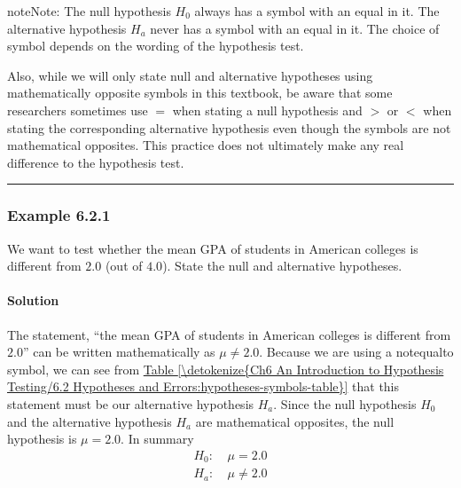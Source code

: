 \documentclass[letterpaper,10pt,english]{jupyterBook}
\begin{document}
\begin{sphinxadmonition}{note}{Note:}
\sphinxAtStartPar
The null hypothesis \(H_0\) always has a symbol with an equal in it. The alternative hypothesis \(H_a\) never has a symbol with an equal in it. The choice of symbol depends on the wording of the hypothesis test.

\sphinxAtStartPar
Also, while we will only state null and alternative hypotheses using mathematically opposite symbols in this textbook, be aware that some researchers sometimes use \(=\) when stating a null hypothesis and \(>\) or \(<\) when stating the corresponding alternative hypothesis even though the symbols are not mathematical opposites. This practice does not ultimately make any real difference to the hypothesis test.
\end{sphinxadmonition}


\bigskip\hrule\bigskip



\subsubsection{Example 6.2.1}
\label{\detokenize{Ch6 An Introduction to Hypothesis Testing/6.2 Hypotheses and Errors:example-6-2-1}}
\sphinxAtStartPar
We want to test whether the mean GPA of students in American colleges is different from \(2.0\) (out of \(4.0\)). State the null and alternative hypotheses.


\paragraph{Solution}
\label{\detokenize{Ch6 An Introduction to Hypothesis Testing/6.2 Hypotheses and Errors:solution}}
\sphinxAtStartPar
The statement, “the mean GPA of students in American colleges is different from \(2.0\)” can be written mathematically as \(\mu \neq 2.0\). Because we are using a not\sphinxhyphen{}equal\sphinxhyphen{}to symbol, we can see from \hyperref[\detokenize{Ch6 An Introduction to Hypothesis Testing/6.2 Hypotheses and Errors:hypotheses-symbols-table}]{Table \ref{\detokenize{Ch6 An Introduction to Hypothesis Testing/6.2 Hypotheses and Errors:hypotheses-symbols-table}}} that this statement must be our alternative hypothesis \(H_a\). Since the null hypothesis \(H_0\) and the alternative hypothesis \(H_a\) are mathematical opposites, the null  hypothesis is \(\mu = 2.0\). In summary
\begin{align*}
H_0:&\  \mu = 2.0 \\
H_a:&\  \mu \neq 2.0
\end{align*}
\end{document}
